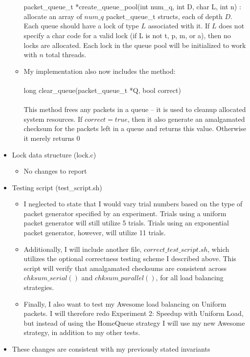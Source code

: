 \documentclass[]{article}
\begin{document}
\begin{itemize}
\begin{itemize}
		\\\\
		packet\_queue\_t *create\_queue\_pool(int num\_q, int D, char L, int n) : allocate an array of $num\_q$ packet\_queue\_t structs, each of depth $D$. Each queue should have a lock of type $L$ associated with it. If $L$ does not specify a char code for a valid lock (if L is not t, p, m, or a), then no locks are allocated. Each lock in the queue pool will be initialized to work with $n$ total threads.
		\item My implementation also now includes the method:
		\\\\
		long clear\_queue(packet\_queue\_t *Q, bool correct) 
		\\\\
		This method frees any packets in a queue -- it is used to cleanup allocated system resources. If $correct = true$, then it also generate an amalgamated checksum for the packets left in a queue and returns this value. Otherwise it merely returns $0$ 
	\end{itemize}
	\item Lock data structure (lock.c)
	\begin{itemize}
		\item No changes to report
	\end{itemize}
	\item Testing script (test\_script.sh)
	\begin{itemize}
		\item I neglected to state that I would vary trial numbers based on the type of packet generator specified by an experiment. Trials using a uniform packet generator will still utilize 5 trials. Trials using an exponential packet generator, however, will utilize 11 trials.
		\item Additionally, I will include another file, $correct\_test\_script.sh$, which utilizes the optional correctness testing scheme I described above. This script will verify that amalgamated checksums are consistent across $chksum\_serial()$ and $chksum\_parallel()$, for all load balancing strategies.
		\item Finally, I also want to test my Awesome load balancing on Uniform packets. I will therefore redo Experiment 2: Speedup with Uniform Load, but instead of using the HomeQueue strategy I will use my new Awesome strategy, in addition to my other tests. 
	\end{itemize}
	\item These changes are consistent with my previously stated invariants
\end{itemize}
\end{document}
